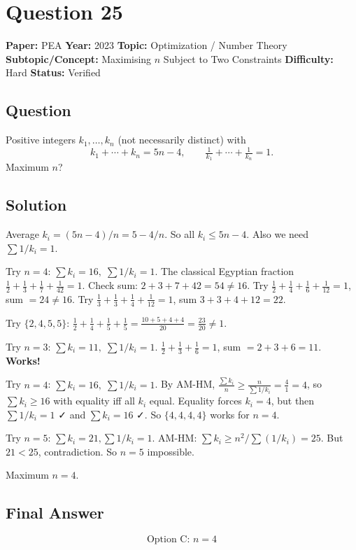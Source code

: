 \documentclass[11pt]{article}
\begin{document}
\medskip

\section*{Question 25}
\textbf{Paper:} PEA \quad \textbf{Year:} 2023 \quad \textbf{Topic:} Optimization / Number Theory \quad \textbf{Subtopic/Concept:} Maximising $n$ Subject to Two Constraints \quad \textbf{Difficulty:} Hard \quad \textbf{Status:} Verified

\subsection*{Question}
Positive integers $k_1,\dots,k_n$ (not necessarily distinct) with
\[
k_1+\cdots+k_n=5n-4,\qquad \tfrac{1}{k_1}+\cdots+\tfrac{1}{k_n}=1.
\]
Maximum $n$?

\subsection*{Solution}
Average $k_i=(5n-4)/n=5-4/n$. So all $k_i\le 5n-4$. Also we need $\sum 1/k_i=1$.

Try $n=4$: $\sum k_i=16,\;\sum 1/k_i=1$. The classical Egyptian fraction $\frac{1}{2}+\frac{1}{3}+\frac{1}{7}+\frac{1}{42}=1$. Check sum: $2+3+7+42=54\ne 16$. Try $\frac{1}{2}+\frac{1}{4}+\frac{1}{6}+\frac{1}{12}=1$, sum $=24\ne 16$. Try $\frac{1}{3}+\frac{1}{3}+\frac{1}{4}+\frac{1}{12}=1$, sum $3+3+4+12=22$.

Try $\{2,4,5,5\}$: $\frac12+\frac14+\frac15+\frac15=\frac{10+5+4+4}{20}=\frac{23}{20}\ne 1$.

Try $n=3$: $\sum k_i=11,\;\sum 1/k_i=1$. $\frac12+\frac13+\frac16=1$, sum $=2+3+6=11$. \textbf{Works!}

Try $n=4$: $\sum k_i=16,\;\sum 1/k_i=1$. By AM-HM, $\frac{\sum k_i}{n}\ge \frac{n}{\sum 1/k_i}=\frac{4}{1}=4$, so $\sum k_i\ge 16$ with equality iff all $k_i$ equal. Equality forces $k_i=4$, but then $\sum 1/k_i=1$ ✓ and $\sum k_i=16$ ✓. So $\{4,4,4,4\}$ works for $n=4$.

Try $n=5$: $\sum k_i=21,\sum 1/k_i=1$. AM-HM: $\sum k_i\ge n^2/\sum(1/k_i)=25$. But $21<25$, contradiction. So $n=5$ impossible.

Maximum $n=4$.

\subsection*{Final Answer}
\[
\boxed{\text{Option C: } n=4}
\]
\end{document}
